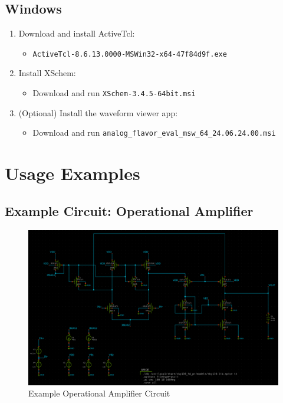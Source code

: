 \documentclass[12pt]{article}
\begin{document}
    \subsection{Windows}\label{subsec:installation-windows}
    \begin{enumerate}
        \item Download and install ActiveTcl:
        \begin{itemize}
            \item \texttt{ActiveTcl-8.6.13.0000-MSWin32-x64-47f84d9f.exe}
        \end{itemize}

        \item Install XSchem:
        \begin{itemize}
            \item Download and run \texttt{XSchem-3.4.5-64bit.msi}
        \end{itemize}

        \item (Optional) Install the waveform viewer app:
        \begin{itemize}
            \item Download and run \texttt{analog\_flavor\_eval\_msw\_64\_24.06.24.00.msi}
        \end{itemize}
    \end{enumerate}


    \section{Usage Examples}\label{sec:usage-examples}

    \subsection{Example Circuit: Operational Amplifier}\label{subsec:example-circuit-operational-amplifier}
    \begin{figure}[htbp]
        \centering
        \includegraphics[width=0.8\linewidth]{example_circuit_opamp}
        \caption{Example Operational Amplifier Circuit}
        \label{fig:opamp}
    \end{figure}
\end{document}
